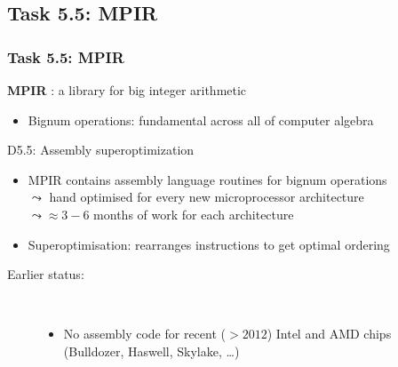 \documentclass{beamer}
\begin{document}
\subsection{Task 5.5: MPIR}
\begin{frame}
  \frametitle{Task 5.5: MPIR}
\begin{center}
  {\Large  \textbf{MPIR} : a library for big integer arithmetic}
\end{center}
\begin{itemize}
  \item Bignum operations: fundamental across all of computer algebra
  \end{itemize}

  \begin{block}
    {D5.5: Assembly superoptimization}
    \begin{itemize}
    \item MPIR contains assembly language routines for bignum operations
    \\ $\leadsto$ hand optimised for every new microprocessor architecture
    \\ $\leadsto \approx 3-6$ months of work for each architecture
    \item Superoptimisation: rearranges instructions to get optimal
      ordering
    \end{itemize}

    \begin{description}
      \item[Earlier status:]\
        \begin{itemize}
        \item No assembly code for recent ($> 2012$) Intel and AMD chips (Bulldozer,
          Haswell, Skylake, \dots)
        \end{itemize}
            \end{description}



    \end{block}
\end{frame}
\end{document}
